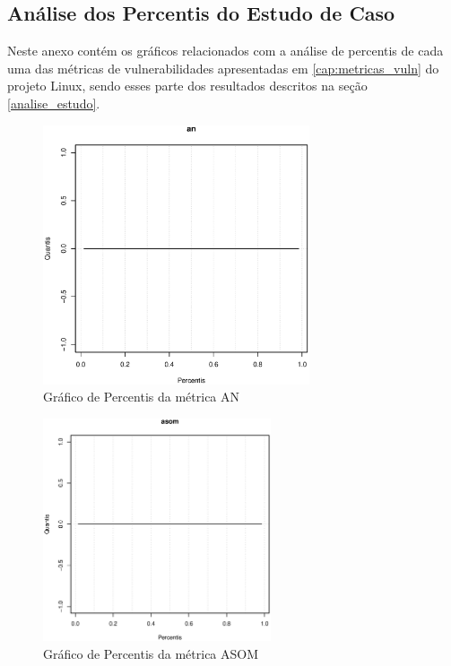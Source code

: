 \begin{anexosenv}

\partanexos

\chapter{Análise dos Percentis do Estudo de Caso} \label{anex:percentis}

Neste anexo contém os gráficos relacionados com a análise de percentis de cada
uma das métricas de vulnerabilidades apresentadas em \ref{cap:metricas_vuln}
do
projeto Linux, sendo esses parte dos resultados descritos na seção \ref{analise_estudo}.


\begin{figure}[h]
  \centering
  \includegraphics[width=0.7\textwidth]
      {dados/linux/an.eps}
  \caption{Gráfico de Percentis da métrica AN}
\end{figure}

\newpage

\begin{figure}[h]
  \centering
  \includegraphics[width=0.6\textwidth]
      {dados/linux/asom.eps}
  \caption{Gráfico de Percentis da métrica ASOM}
  \label{graphic:asom}
\end{figure}


\end{anexosenv}
